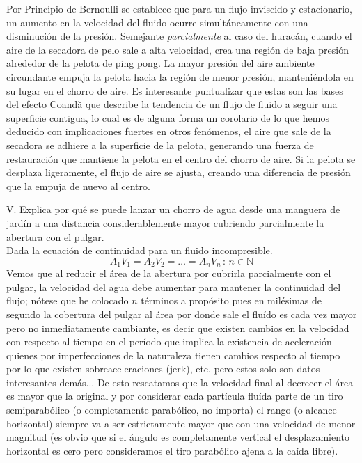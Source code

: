 \documentclass{article}
\begin{document}
Por Principio de Bernoulli se establece que para un flujo inviscido y estacionario, un aumento en la velocidad del fluido ocurre simultáneamente con una disminución de la presión. Semejante \textit{parcialmente} al caso del huracán, cuando el aire de la secadora de pelo sale a alta velocidad, crea una región de baja presión alrededor de la pelota de ping pong. La mayor presión del aire ambiente circundante empuja la pelota hacia la región de menor presión, manteniéndola en su lugar en el chorro de aire. Es interesante puntualizar que estas son las bases del efecto Coandă que describe la tendencia de un flujo de fluido a seguir una superficie contigua, lo cual es de alguna forma un corolario de lo que hemos deducido con implicaciones fuertes en otros fenómenos, el aire que sale de la secadora se adhiere a la superficie de la pelota, generando una fuerza de restauración que mantiene la pelota en el centro del chorro de aire. Si la pelota se desplaza ligeramente, el flujo de aire se ajusta, creando una diferencia de presión que la empuja de nuevo al centro.

\noindent V. Explica por qué se puede lanzar un chorro de agua desde una manguera de jardín a una distancia considerablemente mayor cubriendo parcialmente la abertura con el pulgar. \\

Dada la ecuación de continuidad para un fluido incompresible.
\begin{equation}
    A_1V_1 = A_2V_2 = \dots = A_nV_n \, : \, n\in\mathbb{N}
\end{equation}
Vemos que al reducir el área de la abertura por cubrirla parcialmente con el pulgar, la velocidad del agua debe aumentar para mantener la continuidad del flujo; nótese que he colocado $n$ términos a propósito pues en milésimas de segundo la cobertura del pulgar al área por donde sale el fluído es cada vez mayor pero no inmediatamente cambiante, es decir que existen cambios en la velocidad con respecto al tiempo en el período que implica la existencia de aceleración quienes por imperfecciones de la naturaleza tienen cambios respecto al tiempo por lo que existen sobreaceleraciones (jerk), etc. pero estos solo son datos interesantes demás... De esto rescatamos que la velocidad final al decrecer el área es mayor que la original y por considerar cada partícula fluída parte de un tiro semiparabólico (o completamente parabólico, no importa) el rango (o alcance horizontal) siempre va a ser estrictamente mayor que con una velocidad de menor magnitud (es obvio que si el ángulo es completamente vertical el desplazamiento horizontal es cero pero consideramos el tiro parabólico ajena a la caída libre). \\
\end{document}
